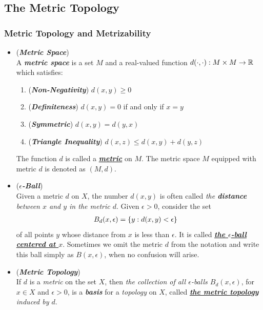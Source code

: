 \documentclass[11pt]{article}
\begin{document}
\subsection{The Metric Topology}
\subsubsection{Metric Topology and Metrizability}
\begin{itemize}
\item \begin{definition} (\emph{\textbf{Metric Space}})\\
A \emph{\textbf{metric space}} is a set $M$ and a real-valued function $d(\cdot , \cdot): M \times M \rightarrow {\mathbb R}$  which satisfies:
\begin{enumerate}
\item (\emph{\textbf{Non-Negativity}}) $d(x, y) \ge 0$
\item (\emph{\textbf{Definiteness}}) $d(x, y) = 0$ if and only if $x = y$
\item (\emph{\textbf{Symmetric}}) $d(x, y) = d(y, x)$
\item (\emph{\textbf{Triangle Inequality}}) $d(x, z) \le d(x, y) + d(y, z)$
\end{enumerate} The function $d$ is called a \underline{\emph{\textbf{metric}}} on $M$. The metric space $M$ equipped with metric $d$ is denoted as $(M, d)$.
\end{definition}

\item \begin{definition} (\emph{\textbf{$\epsilon$-Ball}})\\
Given a metric $d$ on $X$, the number $d(x, y)$ is often called \emph{the \textbf{distance} between $x$ and $y$ in the metric $d$}. Given $\epsilon > 0$, consider the set
\begin{align*}
B_{d}(x, \epsilon) &= \left\{y: d(x,y) < \epsilon\right\}
\end{align*}
of all points $y$ whose distance from $x$ is less than $\epsilon$. It is called \underline{\emph{\textbf{the $\epsilon$-ball centered at $x$}}}. Sometimes we omit the metric $d$ from the notation and write this ball simply as $B(x, \epsilon)$, when no confusion will arise.
\end{definition}

\item \begin{definition} (\emph{\textbf{Metric Topology}})\\
If $d$ is a \emph{metric} on the set $X$, then \emph{the collection of all $\epsilon$-balls $B_{d}(x, \epsilon)$}, for $x \in X$ and $\epsilon > 0$, is a \emph{\textbf{basis}} for a \emph{topology} on $X$, called \emph{\underline{\textbf{the metric topology}} induced by $d$}.
\end{definition}


\end{itemize}
\end{document}
